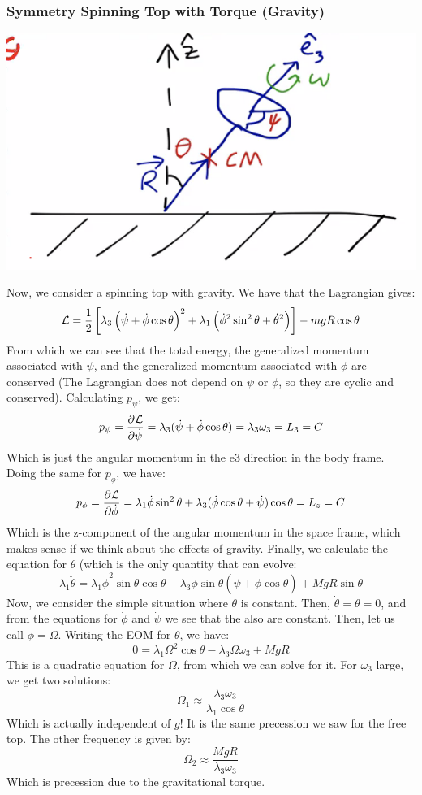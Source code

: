\documentclass[../PHYS306Notes.tex]{subfiles}
\begin{document}
\subsubsection{Symmetry Spinning Top with Torque (Gravity)}
\begin{center}
    \includegraphics[scale=0.5]{l21-img2.png}
\end{center}
Now, we consider a spinning top with gravity. We have that the Lagrangian gives:
\[\mathcal{L} = \frac{1}{2}\left[\lambda_3\left(\dot{\psi} + \dot{\phi}\cos\theta\right)^2 + \lambda_1\left(\dot{\phi}^2\sin^2\theta + \dot{\theta}^2\right)\right] - mgR\cos\theta\]
From which we can see that the total energy, the generalized momentum associated with $\psi$, and the generalized momentum associated with $\phi$ are conserved (The Lagrangian does not depend on $\psi$ or $\phi$, so they are cyclic and conserved). Calculating $p_\psi$, we get:
\[p_\psi = \dpd{\LL}{\dot{\psi}} = \lambda_3(\dot{\psi} + \dot{\phi}\cos\theta) = \lambda_3\omega_3 = L_3 = C\]
Which is just the angular momentum in the e3 direction in the body frame. Doing the same for $p_\phi$, we have:
\[p_{\phi} = \dpd{\LL}{\dot{\phi}} = \lambda_1\dot{\phi}\sin^2\theta + \lambda_3(\dot{\phi}\cos\theta + \dot{\psi})\cos\theta = L_z = C\]
Which is the z-component of the angular momentum in the space frame, which makes sense if we think about the effects of gravity. Finally, we calculate the equation for $\theta$ (which is the only quantity that can evolve:
\[\lambda_1\ddot{\theta} = \lambda_1\dot{\phi}^2\sin\theta\cos\theta - \lambda_3\dot{\phi}\sin\theta(\dot{\psi} + \dot{\phi}\cos\theta) + MgR\sin\theta\]
Now, we consider the simple situation where $\theta$ is constant. Then, $\dot{\theta} = \ddot{\theta} = 0$, and from the equations for $\dot{\phi}$ and $\dot{\psi}$ we see that the also are constant. Then, let us call $\dot{\phi} = \Omega$. Writing the EOM for $\theta$, we have:
\[0 = \lambda_1\Omega^2\cos\theta - \lambda_3\Omega\omega_3 + MgR\]
This is a quadratic equation for $\Omega$, from which we can solve for it. For $\omega_3$ large, we get two solutions:
\[\Omega_1 \approx \frac{\lambda_3\omega_3}{\lambda_1\cos\theta}\]
Which is actually independent of $g$! It is the same precession we saw for the free top. The other frequency is given by:
\[\Omega_2 \approx \frac{MgR}{\lambda_3\omega_3}\]
Which is precession due to the gravitational torque. 
\end{document}
